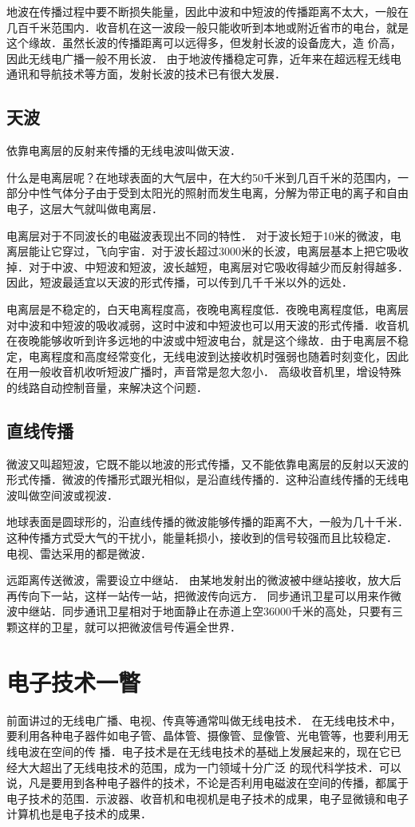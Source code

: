 地波在传播过程中要不断损失能量，因此中波和中短波的传播距离不太大，一般在几百千米范围内．收音机在这一波段一般只能收听到本地或附近省市的电台，就是这个缘故．虽然长波的传播距离可以远得多，但发射长波的设备庞大，造
价高，因此无线电广播一般不用长波．
由于地波传播稳定可靠，近年来在超远程无线电通讯和导航技术等方面，发射长波的技术已有很大发展．

\subsection{天波}

依靠电离层的反射来传播的无线电波叫做天波．

什么是电离层呢？在地球表面的大气层中，在大约50千米到几百千米的范围内，一部分中性气体分子由于受到太阳光的照射而发生电离，分解为带正电的离子和自由电子，这层大气就叫做电离层．

电离层对于不同波长的电磁波表现出不同的特性．
对于波长短于10米的微波，电离层能让它穿过，飞向宇宙．对于波长超过3000米的长波，电离层基本上把它吸收掉．对于中波、中短波和短波，波长越短，电离层对它吸收得越少而反射得越多．因此，短波最适宜以天波的形式传播，可以传到几千千米以外的远处．

电离层是不稳定的，白天电离程度高，夜晚电离程度低．夜晚电离程度低，电离层对中波和中短波的吸收减弱，这时中波和中短波也可以用天波的形式传播．收音机在夜晚能够收听到许多远地的中波或中短波电台，就是这个缘故．由于电离层不稳定，电离程度和高度经常变化，无线电波到达接收机时强弱也随着时刻变化，因此在用一般收音机收听短波广播时，声音常是忽大忽小．
高级收音机里，增设特殊的线路自动控制音量，来解决这个问题．

\subsection{直线传播}

微波又叫超短波，它既不能以地波的形式传播，又不能依靠电离层的反射以天波的形式传播．微波的传播形式跟光相似，是沿直线传播的．这种沿直线传播的无线电波叫做空间波或视波．

地球表面是圆球形的，沿直线传播的微波能够传播的距离不大，一般为几十千米．这种传播方式受大气的干扰小，能量耗损小，接收到的信号较强而且比较稳定．
电视、雷达采用的都是微波．

远距离传送微波，需要设立中继站．
由某地发射出的微波被中继站接收，放大后再传向下一站，这样一站传一站，把微波传向远方．
同步通讯卫星可以用来作微波中继站．同步通讯卫星相对于地面静止在赤道上空36000千米的高处，只要有三颗这样的卫星，就可以把微波信号传遍全世界．

\section{电子技术一瞥}
前面讲过的无线电广播、电视、传真等通常叫做无线电技术．
在无线电技术中，要利用各种电子器件如电子管、晶体管、摄像管、显像管、光电管等，也要利用无线电波在空间的传
播．电子技术是在无线电技术的基础上发展起来的，现在它已经大大超出了无线电技术的范围，成为一门领域十分广泛
的现代科学技术．可以说，凡是要用到各种电子器件的技术，不论是否利用电磁波在空间的传播，都属于电子技术的范围．示波器、收音机和电视机是电子技术的成果，电子显微镜和电子计算机也是电子技术的成果．

